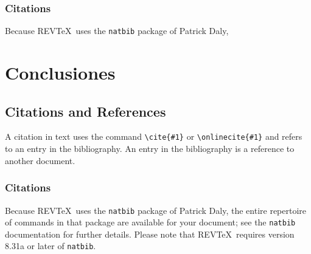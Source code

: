 \documentclass[%
 reprint,
 amsmath,amssymb,
 aps,
]{revtex4-1}
\begin{document}
\subsubsection{Citations}
Because REV\TeX\ uses the \verb+natbib+ package of Patrick Daly, 




 


 


\section{\label{sec:level1}Conclusiones}



\subsection{\label{sec:citeref}Citations and References}
A citation in text uses the command \verb+\cite{#1}+ or
\verb+\onlinecite{#1}+ and refers to an entry in the bibliography. 
An entry in the bibliography is a reference to another document.

\subsubsection{Citations}
Because REV\TeX\ uses the \verb+natbib+ package of Patrick Daly, 
the entire repertoire of commands in that package are available for your document;
see the \verb+natbib+ documentation for further details. Please note that
REV\TeX\ requires version 8.31a or later of \verb+natbib+.
\end{document}
